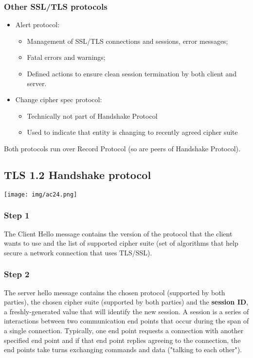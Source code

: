 \documentclass[a4paper, 10pt, titlepage]{article}
\begin{document}
\subsubsection{Other SSL/TLS protocols}
\begin{itemize}
\item Alert protocol:
\begin{itemize}
\item Management of SSL/TLS connections and sessions, error messages;
\item Fatal errors and warnings;
\item Defined actions to ensure clean session termination by both client and server.
\end{itemize}
\item Change cipher spec protocol:
\begin{itemize}
\item Technically not part of Handshake Protocol
\item Used to indicate that entity is changing to recently agreed cipher suite
\end{itemize}
\end{itemize}
Both protocols run over Record Protocol (so are peers of Handshake Protocol).

\subsection{TLS 1.2 Handshake protocol}
\begin{minipage}{0.4\textwidth}
\texttt{[image: img/ac24.png]}
\end{minipage}
\hfill
\begin{minipage}{0.5\textwidth}
\subsubsection*{Step 1}
The Client Hello message contains the version of the protocol that the client wants to use and the list of supported cipher suite (set of algorithms that help secure a network connection that uses TLS/SSL).
\subsubsection*{Step 2}
The server hello message contains the chosen protocol (supported by both parties), the chosen cipher suite (supported by both parties) and the \textbf{session ID}, a freshly-generated value that will identify the new session. A session is a series of interactions between two communication end points that occur during the span of a single connection. Typically, one end point requests a connection with another specified end point and if that end point replies agreeing to the connection, the end points take turns exchanging commands and data ("talking to each other"). 
\end{minipage}
\end{document}
